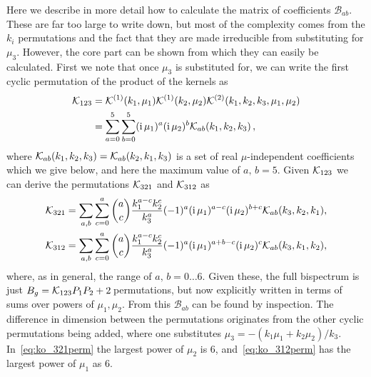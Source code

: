 Here we describe in more detail how to calculate the matrix of coefficients $\mathcal{B}_{ab}$. These are far too large to write down, but most of the complexity comes from the $k_i$ permutations and the fact that they are made irreducible from substituting for $\mu_3$. However, the core part can be shown from which they can easily be calculated. First we note that once $\mu_3$ is substituted for, we can write the first cyclic permutation of the product of the kernels as  
\begin{align}
	\mathcal{K}_{123} &= \mathcal{K}^{(1)}(k_1,\mu_1)\mathcal{K}^{(1)}(k_2,\mu_2)\mathcal{K}^{(2)}(k_1,k_2,k_3,\mu_1,\mu_2)\nonumber \\
	&= \sum_{a=0}^5\sum_{b=0}^5 (\mathrm{i\,} \mu_1)^a (\mathrm{i\,} \mu_2)^b \mathcal{K}_{ab}(k_1,k_2,k_3)\,,
\end{align}
where \(\mathcal{K}_{ab}(k_1,k_2,k_3)=\mathcal{K}_{ab}(k_2,k_1,k_3)\) is a set of real \(\mu\)-independent coefficients which we give below, and here the maximum value of \(a,\,b = 5\). Given $\mathcal{K}_{123}$ we can derive the permutations $\mathcal{K}_{321}$ and $\mathcal{K}_{312}$ as
\begin{align}
	&\mathcal{K}_{321} = \sum_{a,b} \sum_{c=0}^a \binom{a}{c} \frac{k_1^{a-c} k_2^c}{k_3^a} (-1)^a (\mathrm{i\,} \mu_1)^{a-c} (\mathrm{i\,} \mu_2)^{b+c} \mathcal{K}_{ab}(k_3,k_2,k_1)\label{eq:ko_321perm}, \\
	&\mathcal{K}_{312} = \sum_{a,b} \sum_{c=0}^a \binom{a}{c} \frac{k_1^{a-c} k_2^c}{k_3^a} (-1)^a (\mathrm{i\,} \mu_1)^{a+b-c} (\mathrm{i\,} \mu_2)^{c} \mathcal{K}_{ab}(k_3,k_1,k_2),\label{eq:ko_312perm}
\end{align} 
where, as in general, the range of \(a,\,b = 0 \dots 6\).
Given these, the full bispectrum is just $B_g=\mathcal{K}_{123}P_1P_2+2\,$permutations, but now explicitly written in terms of sums over powers of $\mu_1,\mu_2$.  From this $\mathcal{B}_{ab}$ can be found by inspection. The difference in dimension between the permutations originates from the other cyclic permutations being added, where one substitutes \(\mu_3 = - \left( k_1 \mu_1 + k_2 \mu_2 \right)/k_3\). In~\eqref{eq:ko_321perm}  the largest power of $\mu_2$ is 6, and~\eqref{eq:ko_312perm} has the largest power of $\mu_1$ as 6.

